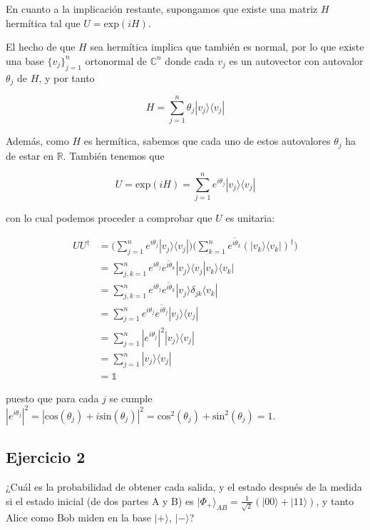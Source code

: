 \documentclass{article}
\begin{document}
En cuanto a la implicación restante, supongamos que existe 
una matriz $H$ hermítica tal que $U = \text{exp}(iH)$.

El hecho de que $H$ sea hermítica implica que también 
es normal, por lo que existe una base $\{v_j\}_{j=1}^n$ 
ortonormal de $\mathbb{C}^n$ donde cada $v_j$ es un 
autovector con autovalor $\theta_j$ de $H$, y por tanto

$$
  H = \sum_{j=1}^n \theta_j |v_j \rangle\langle v_j|
$$

Además, como $H$ es hermítica, sabemos que cada uno de
estos autovalores $\theta_j$ ha de estar en $\mathbb{R}$.
También tenemos que

$$
  U = \text{exp}(iH) 
    = \sum_{j=1}^n e^{i \theta_j} |v_j \rangle\langle v_j|
$$

con lo cual podemos proceder a comprobar que $U$ es unitaria:

\begin{align*}
  UU^\dagger &= \Big(
      \sum_{j=1}^n e^{i \theta_j} 
        |v_j \rangle\langle v_j|
    \Big) \Big(
      \sum_{k=1}^n \overline{e^{i \theta_k}} 
        (|v_k \rangle\langle v_k|)^\dagger
      \Big) \\
    &= \sum_{j,k=1}^n e^{i \theta_j}\overline{e^{i \theta_k}} 
        |v_j \rangle\langle v_j|v_k \rangle \langle v_k| \\
    &= \sum_{j,k=1}^n e^{i \theta_j}\overline{e^{i \theta_k}} 
        |v_j \rangle \delta_{jk} \langle v_k| \\
    &= \sum_{j=1}^n e^{i \theta_j}\overline{e^{i \theta_j}} 
        |v_j \rangle \langle v_j| \\
    &= \sum_{j=1}^n |e^{i \theta_j}|^2 
        |v_j \rangle \langle v_j| \\
    &= \sum_{j=1}^n |v_j \rangle \langle v_j| \\
    &= \mathbb{1}
\end{align*}

puesto que para cada $j$ se cumple
$
|e^{i\theta_j}|^2
  = |\text{cos}(\theta_j) + i\text{sin}(\theta_j)|^2
  = \text{cos}^2(\theta_j) + \text{sin}^2(\theta_j)
  = 1
$.

\subsection*{Ejercicio 2}

¿Cuál es la probabilidad de obtener cada salida, y el estado
después de la medida si el estado inicial 
(de dos partes A y B)
es $|\Phi_+ \rangle_{AB} = \frac{1}{\sqrt{2}}(|00\rangle + 
|11\rangle)$, y tanto Alice como Bob miden en la base 
$|+\rangle$, $|-\rangle$?
\end{document}
